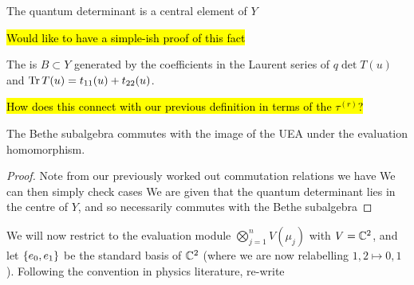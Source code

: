 \documentclass{article}
\begin{document}
\begin{fact}
The quantum determinant is a central element of $Y$
\end{fact}
\hl{Would like to have a simple-ish proof of this fact}

\begin{definition}
The  is $B \subset Y$ generated by the coefficients in the Laurent series of $q\det T(u) $ and $\operatorname{Tr} T(u) = t_{11}(u) + t_{22}(u)$.
\end{definition}

\begin{remark}
\hl{How does this connect with our previous definition in terms of the $\tau^{(r)}$?} 
\end{remark}

\begin{prop}
The Bethe subalgebra commutes with the image of the UEA under the evaluation homomorphism. 
\end{prop}
\begin{proof}
Note from our previously worked out commutation relations we have 
We can then simply check cases
We are given that the quantum determinant lies in the centre of $Y$, and so necessarily commutes with the Bethe subalgebra
\end{proof}

We will now restrict to the evaluation module $\bigotimes_{j=1}^n V(\mu_j)$ with $V = \mathbb{C}^2$, and let $\left\{ e_0,e_1 \right\}$ be the standard basis of $\mathbb{C}^2$ (where we are now relabelling $1,2 \mapsto 0,1$). Following the convention in physics literature, re-write 
\end{document}
